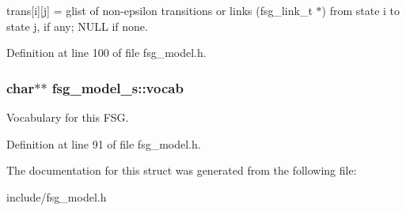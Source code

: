 trans[i][j] = glist of non-epsilon transitions or links (fsg\_\-link\_\-t $\ast$) from state i to state j, if any; NULL if none. 



Definition at line 100 of file fsg\_\-model.h.
\subsubsection[{vocab}]{\setlength{\rightskip}{0pt plus 5cm}char$\ast$$\ast$ {\bf fsg\_\-model\_\-s::vocab}}\label{structfsg__model__s_6bbfce2d672624d792ff964200a64031}


Vocabulary for this FSG. 



Definition at line 91 of file fsg\_\-model.h.

The documentation for this struct was generated from the following file:\begin{CompactItemize}
\item 
include/fsg\_\-model.h\end{CompactItemize}
